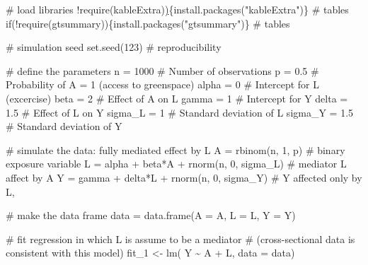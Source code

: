 \documentclass[
  singlecolumn]{article}
\newenvironment{Shaded}{}{}
\newcommand{\AttributeTok}[1]{\textcolor[rgb]{0.84,0.23,0.29}{#1}}
\newcommand{\CommentTok}[1]{\textcolor[rgb]{0.42,0.45,0.49}{#1}}
\newcommand{\ControlFlowTok}[1]{\textcolor[rgb]{0.84,0.23,0.29}{#1}}
\newcommand{\DecValTok}[1]{\textcolor[rgb]{0.00,0.36,0.77}{#1}}
\newcommand{\ErrorTok}[1]{\textcolor[rgb]{1.00,0.33,0.33}{\underline{#1}}}
\newcommand{\FloatTok}[1]{\textcolor[rgb]{0.00,0.36,0.77}{#1}}
\newcommand{\FunctionTok}[1]{\textcolor[rgb]{0.44,0.26,0.76}{#1}}
\newcommand{\NormalTok}[1]{\textcolor[rgb]{0.14,0.16,0.18}{#1}}
\newcommand{\OtherTok}[1]{\textcolor[rgb]{0.44,0.26,0.76}{#1}}
\newcommand{\SpecialCharTok}[1]{\textcolor[rgb]{0.00,0.36,0.77}{#1}}
\newcommand{\StringTok}[1]{\textcolor[rgb]{0.01,0.18,0.38}{#1}}
\begin{document}
\begin{Shaded}
\begin{Highlighting}[]
\CommentTok{\# load libraries}
\SpecialCharTok{!}\FunctionTok{require}\NormalTok{(kableExtra)}\ErrorTok{)}\NormalTok{\{}\FunctionTok{install.packages}\NormalTok{(}\StringTok{"kableExtra"}\NormalTok{)\} }\CommentTok{\# tables}
\ControlFlowTok{if}\NormalTok{(}\SpecialCharTok{!}\FunctionTok{require}\NormalTok{(gtsummary))\{}\FunctionTok{install.packages}\NormalTok{(}\StringTok{"gtsummary"}\NormalTok{)\} }\CommentTok{\# tables}

\CommentTok{\# simulation seed}
\FunctionTok{set.seed}\NormalTok{(}\DecValTok{123}\NormalTok{) }\CommentTok{\#  reproducibility}

\CommentTok{\# define the parameters }
\NormalTok{n }\OtherTok{=} \DecValTok{1000} \CommentTok{\# Number of observations}
\NormalTok{p }\OtherTok{=} \FloatTok{0.5}  \CommentTok{\# Probability of A = 1 (access to greenspace)}
\NormalTok{alpha }\OtherTok{=} \DecValTok{0} \CommentTok{\# Intercept for L (excercise)}
\NormalTok{beta }\OtherTok{=} \DecValTok{2}  \CommentTok{\# Effect of A on L }
\NormalTok{gamma }\OtherTok{=} \DecValTok{1} \CommentTok{\# Intercept for Y }
\NormalTok{delta }\OtherTok{=} \FloatTok{1.5} \CommentTok{\# Effect of L on Y}
\NormalTok{sigma\_L }\OtherTok{=} \DecValTok{1} \CommentTok{\# Standard deviation of L}
\NormalTok{sigma\_Y }\OtherTok{=} \FloatTok{1.5} \CommentTok{\# Standard deviation of Y}

\CommentTok{\# simulate the data: fully mediated effect by L}
\NormalTok{A }\OtherTok{=} \FunctionTok{rbinom}\NormalTok{(n, }\DecValTok{1}\NormalTok{, p) }\CommentTok{\# binary exposure variable}
\NormalTok{L }\OtherTok{=}\NormalTok{ alpha }\SpecialCharTok{+}\NormalTok{ beta}\SpecialCharTok{*}\NormalTok{A }\SpecialCharTok{+} \FunctionTok{rnorm}\NormalTok{(n, }\DecValTok{0}\NormalTok{, sigma\_L) }\CommentTok{\# mediator L affect by A}
\NormalTok{Y }\OtherTok{=}\NormalTok{ gamma }\SpecialCharTok{+}\NormalTok{ delta}\SpecialCharTok{*}\NormalTok{L }\SpecialCharTok{+} \FunctionTok{rnorm}\NormalTok{(n, }\DecValTok{0}\NormalTok{, sigma\_Y) }\CommentTok{\# Y affected only by L,}

\CommentTok{\# make the data frame}
\NormalTok{data }\OtherTok{=} \FunctionTok{data.frame}\NormalTok{(}\AttributeTok{A =}\NormalTok{ A, }\AttributeTok{L =}\NormalTok{ L, }\AttributeTok{Y =}\NormalTok{ Y)}

\CommentTok{\# fit regression in which L is assume to be a mediator}
\CommentTok{\# (cross{-}sectional data is consistent with this model)}
\NormalTok{fit\_1 }\OtherTok{\textless{}{-}} \FunctionTok{lm}\NormalTok{( Y }\SpecialCharTok{\textasciitilde{}}\NormalTok{ A }\SpecialCharTok{+}\NormalTok{ L, }\AttributeTok{data =}\NormalTok{ data)}


\end{Highlighting}
\end{Shaded}
\end{document}
